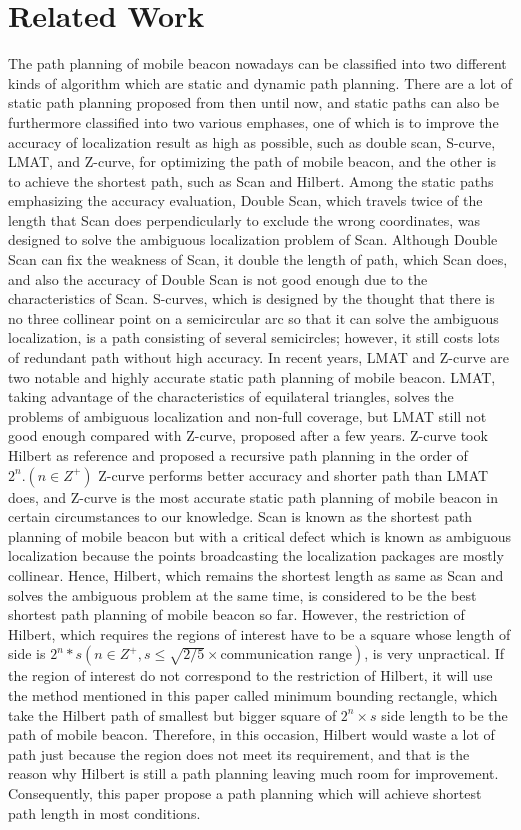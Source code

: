 \documentclass[conference]{IEEEtran}
\begin{document}
\section{Related Work}
The path planning of mobile beacon nowadays can be classified into two different kinds of algorithm which are static and dynamic path planning. There are a lot of static path planning proposed from then until now, and static paths can also be furthermore classified into two various emphases, one of which is to improve the accuracy of localization result as high as possible, such as double scan, S-curve, LMAT, and Z-curve, for optimizing the path of mobile beacon, and the other is to achieve the shortest path, such as Scan and Hilbert.
Among the static paths emphasizing the accuracy evaluation, Double Scan, which travels twice of the length that Scan does perpendicularly to exclude the wrong coordinates, was designed to solve the ambiguous localization problem of Scan. Although Double Scan can fix the weakness of Scan, it double the length of path, which Scan does, and also the accuracy of Double Scan is not good enough due to the characteristics of Scan. S-curves, which is designed by the thought that there is no three collinear point on a semicircular arc so that it can solve the ambiguous localization, is a path consisting of several semicircles; however, it still costs lots of redundant path without high accuracy. In recent years, LMAT and Z-curve are two notable and highly accurate static path planning of mobile beacon. LMAT, taking advantage of the characteristics of equilateral triangles, solves the problems of ambiguous localization and non-full coverage, but LMAT still not good enough compared with Z-curve, proposed after a few years. Z-curve took Hilbert as reference and proposed a recursive path planning in the order of \(2^n. (n\in Z^+)\) Z-curve performs better accuracy and shorter path than LMAT does, and Z-curve is the most accurate static path planning of mobile beacon in certain circumstances to our knowledge.
Scan is known as the shortest path planning of mobile beacon but with a critical defect which is known as ambiguous localization because the points broadcasting the localization packages are mostly collinear. Hence, Hilbert, which remains the shortest length as same as Scan and solves the ambiguous problem at the same time, is considered to be the best shortest path planning of mobile beacon so far. However, the restriction of Hilbert, which requires the regions of interest have to be a square whose length of side is \(2^n*s  (n\in Z^+,s\leq\sqrt{2/5}\times \textrm{communication range})\), is very unpractical. If the region of interest do not correspond to the restriction of Hilbert, it will use the method mentioned in this paper called minimum bounding rectangle, which take the Hilbert path of smallest but bigger square of \(2^n\times s\) side length to be the path of mobile beacon. Therefore, in this occasion, Hilbert would waste a lot of path just because the region does not meet its requirement, and that is the reason why Hilbert is still a path planning leaving much room for improvement. Consequently, this paper propose a path planning which will achieve shortest path length in most conditions.
\end{document}
